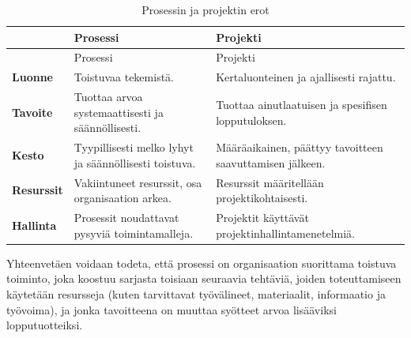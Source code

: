 \documentclass[
  finnish,
  letterpaper,
  DIV=11,
  numbers=noendperiod,
  oneside]{scrreprt}
\begin{document}
\begin{longtable}[]{@{}
  >{\raggedright\arraybackslash}p{}
  >{\raggedright\arraybackslash}p{}
  >{\raggedright\arraybackslash}p{}@{}}
\caption[Prosessin ja projektin erot]{Prosessin ja projektin
erot\sidenotemark{}}\label{tbl-prosessi-projekti}\tabularnewline
\toprule\noalign{}
\begin{minipage}[b]{\linewidth}\raggedright
\end{minipage} & \begin{minipage}[b]{\linewidth}\raggedright
Prosessi
\end{minipage} & \begin{minipage}[b]{\linewidth}\raggedright
Projekti
\end{minipage} \\
\midrule\noalign{}
\endfirsthead
\toprule\noalign{}
\begin{minipage}[b]{\linewidth}\raggedright
\end{minipage} & \begin{minipage}[b]{\linewidth}\raggedright
Prosessi
\end{minipage} & \begin{minipage}[b]{\linewidth}\raggedright
Projekti
\end{minipage} \\
\midrule\noalign{}
\endhead
\bottomrule\noalign{}
\endlastfoot
\textbf{Luonne} & Toistuvaa tekemistä. & Kertaluonteinen ja ajallisesti
rajattu. \\
\textbf{Tavoite} & Tuottaa arvoa systemaattisesti ja säännöllisesti. &
Tuottaa ainutlaatuisen ja spesifisen lopputuloksen. \\
\textbf{Kesto} & Tyypillisesti melko lyhyt ja säännöllisesti toistuva. &
Määräaikainen, päättyy tavoitteen saavuttamisen jälkeen. \\
\textbf{Resurssit} & Vakiintuneet resurssit, osa organisaation arkea. &
Resurssit määritellään projektikohtaisesti. \\
\textbf{Hallinta} & Prosessit noudattavat pysyviä toimintamalleja. &
Projektit käyttävät projektinhallintamenetelmiä. \\
\end{longtable}


Yhteenvetäen voidaan todeta, että prosessi on organisaation suorittama
toistuva toiminto, joka koostuu sarjasta toisiaan seuraavia tehtäviä,
joiden toteuttamiseen käytetään resursseja (kuten tarvittavat
työvälineet, materiaalit, informaatio ja työvoima), ja jonka tavoitteena
on muuttaa syötteet arvoa lisääviksi lopputuotteiksi.
\end{document}
